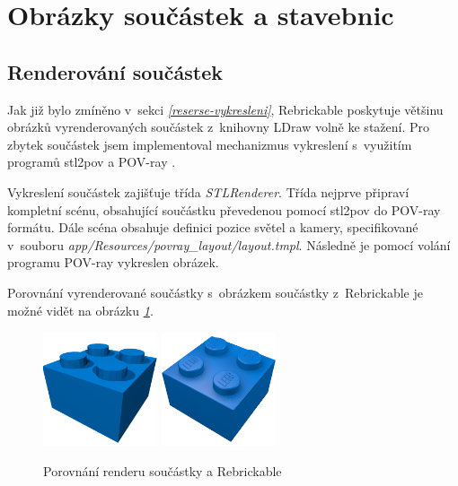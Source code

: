 \section{Obrázky součástek a stavebnic}
\subsection{Renderování součástek}
Jak již bylo zmíněno v~sekci \emph{\ref{reserse-vykresleni}}, Rebrickable poskytuje většinu obrázků vyrenderovaných součástek z~knihovny LDraw volně ke stažení. Pro zbytek součástek jsem implementoval mechanizmus vykreslení s~využitím programů stl2pov \autocite{stl2pov} a POV-ray \autocite{povray}.

Vykreslení součástek zajišťuje třída \textit{STLRenderer}. Třída nejprve připraví kompletní scénu, obsahující součástku převedenou pomocí stl2pov do POV-ray formátu. Dále scéna obsahuje definici pozice světel a kamery, specifikované v~souboru \textit{app/Resources/povray\_layout/layout.tmpl}. Následně je pomocí volání programu POV-ray vykreslen obrázek. 

Porovnání vyrenderované součástky s~obrázkem součástky z~Rebrickable je možné vidět na obrázku \emph{\ref{porovnani-render}}.

\begin{figure}[htbp]
    \centering
    \includegraphics[width=0.30\textwidth,height=\textheight,keepaspectratio]{images/povray.png}
    \includegraphics[width=0.30\textwidth,height=\textheight,keepaspectratio]{images/3003.png}
    \caption{Porovnání renderu součástky a Rebrickable \autocite{rebrickable:part:image:3003}\label{porovnani-render}}
\end{figure}


